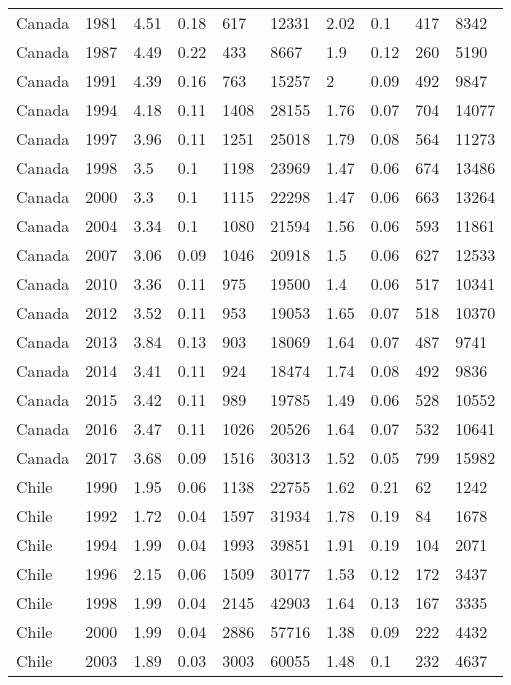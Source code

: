 \begin{tabular}{llllllllll}
Canada & 1981 & 4.51 & 0.18 & 617 & 12331 & 2.02 & 0.1 & 417 & 8342 \\ 
Canada & 1987 & 4.49 & 0.22 & 433 & 8667 & 1.9 & 0.12 & 260 & 5190 \\ 
Canada & 1991 & 4.39 & 0.16 & 763 & 15257 & 2 & 0.09 & 492 & 9847 \\ 
Canada & 1994 & 4.18 & 0.11 & 1408 & 28155 & 1.76 & 0.07 & 704 & 14077 \\ 
Canada & 1997 & 3.96 & 0.11 & 1251 & 25018 & 1.79 & 0.08 & 564 & 11273 \\ 
Canada & 1998 & 3.5 & 0.1 & 1198 & 23969 & 1.47 & 0.06 & 674 & 13486 \\ 
Canada & 2000 & 3.3 & 0.1 & 1115 & 22298 & 1.47 & 0.06 & 663 & 13264 \\ 
Canada & 2004 & 3.34 & 0.1 & 1080 & 21594 & 1.56 & 0.06 & 593 & 11861 \\ 
Canada & 2007 & 3.06 & 0.09 & 1046 & 20918 & 1.5 & 0.06 & 627 & 12533 \\ 
Canada & 2010 & 3.36 & 0.11 & 975 & 19500 & 1.4 & 0.06 & 517 & 10341 \\ 
Canada & 2012 & 3.52 & 0.11 & 953 & 19053 & 1.65 & 0.07 & 518 & 10370 \\ 
Canada & 2013 & 3.84 & 0.13 & 903 & 18069 & 1.64 & 0.07 & 487 & 9741 \\ 
Canada & 2014 & 3.41 & 0.11 & 924 & 18474 & 1.74 & 0.08 & 492 & 9836 \\ 
Canada & 2015 & 3.42 & 0.11 & 989 & 19785 & 1.49 & 0.06 & 528 & 10552 \\ 
Canada & 2016 & 3.47 & 0.11 & 1026 & 20526 & 1.64 & 0.07 & 532 & 10641 \\ 
Canada & 2017 & 3.68 & 0.09 & 1516 & 30313 & 1.52 & 0.05 & 799 & 15982 \\ 
Chile & 1990 & 1.95 & 0.06 & 1138 & 22755 & 1.62 & 0.21 & 62 & 1242 \\ 
Chile & 1992 & 1.72 & 0.04 & 1597 & 31934 & 1.78 & 0.19 & 84 & 1678 \\ 
Chile & 1994 & 1.99 & 0.04 & 1993 & 39851 & 1.91 & 0.19 & 104 & 2071 \\ 
Chile & 1996 & 2.15 & 0.06 & 1509 & 30177 & 1.53 & 0.12 & 172 & 3437 \\ 
Chile & 1998 & 1.99 & 0.04 & 2145 & 42903 & 1.64 & 0.13 & 167 & 3335 \\ 
Chile & 2000 & 1.99 & 0.04 & 2886 & 57716 & 1.38 & 0.09 & 222 & 4432 \\ 
Chile & 2003 & 1.89 & 0.03 & 3003 & 60055 & 1.48 & 0.1 & 232 & 4637 \\ 

\end{tabular}
